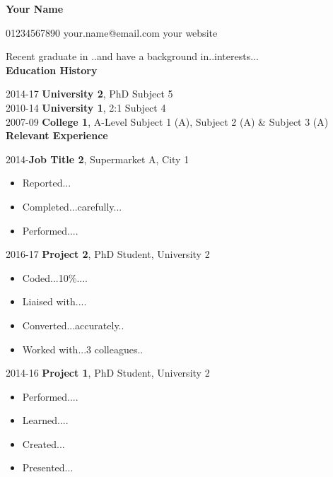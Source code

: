 \documentclass[11pt]{report}
\begin{document}
\begin{center}	
	\begin{huge}
	\textbf{Your Name} \\
	\end{huge}
	01234567890 \qquad your.name@email.com \qquad your website
\end{center}

Recent graduate in ..and have a background in..interests...\\


\textbf{Education History}
\newline

2014-17 \qquad \textbf{University 2}, PhD Subject 5 \\
2010-14 \qquad \textbf{University 1}, 2:1 Subject 4 \\
2007-09 \qquad \textbf{College 1}, A-Level Subject 1 (A), Subject 2 (A) \& Subject 3 (A) \\

\textbf{Relevant Experience} 
\newline 

2014-\space\space  \qquad \textbf{Job Title 2}, Supermarket A, City 1 \\
\begin{itemize}
	\item Reported... 
	\item Completed...carefully...  
	\item Performed.... 
	\newline
\end{itemize}

2016-17 \qquad \textbf{Project 2}, PhD Student, University 2  \\
\begin{itemize}
	\item Coded...10\%....  
	\item Liaised with....
	\item Converted...accurately..
	\item Worked with...3 colleagues..   
	\newline 
\end{itemize}	


2014-16 \qquad \textbf{Project 1}, PhD Student, University 2 \\
\begin{itemize}
	\item Performed.... 
	\item Learned....
	\item Created...
	\item Presented...  
	\newline 
\end{itemize}
\end{document}
